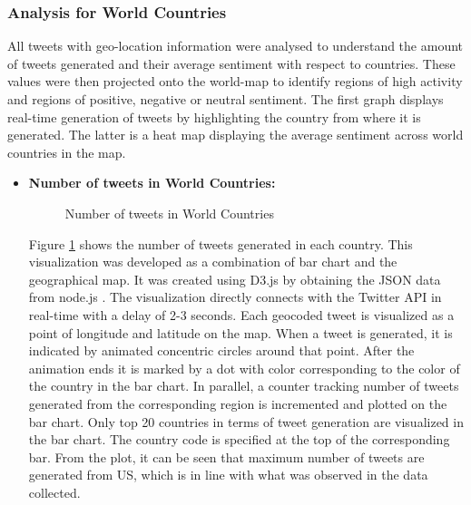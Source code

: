 \documentclass[9pt,twocolumn,twoside]{styles/osajnl}
\begin{document}
\subsubsection{Analysis for World Countries}
All tweets with geo-location information were analysed to understand the amount of tweets generated and their average sentiment with respect to countries. These values were then projected onto the world-map to identify regions of high activity and regions of positive, negative or neutral sentiment. The first graph displays real-time generation of tweets by highlighting the country from where it is generated. The latter is a heat map displaying the average sentiment across world countries in the map.
\begin{itemize}
    \item \textbf{Number of tweets in World Countries:}\\
    \begin{figure}[htbp]
    \centering
    \caption{Number of tweets in World Countries}
    \label{fig:worldno}
    \end{figure}
    Figure \ref{fig:worldno} shows the number of tweets generated in each country. This visualization was developed as a combination of bar chart and the geographical map. It was created using D3.js by obtaining the JSON data from node.js \cite{www-d3}. The visualization directly connects with the Twitter API in real-time with a delay of 2-3 seconds. Each geocoded tweet is visualized as a point of longitude and latitude on the map. When a tweet is generated, it is indicated by animated concentric circles around that point. After the animation ends it is marked by a dot with color corresponding to the color of the country in the bar chart. In parallel, a counter tracking number of tweets generated from the corresponding region is incremented and plotted on the bar chart. Only top 20 countries in terms of tweet generation are visualized in the bar chart. The country code is specified at the top of the corresponding bar. From the plot, it can be seen that maximum number of tweets are generated from US, which is in line with what was observed in the data collected.
\end{itemize}
\end{document}
